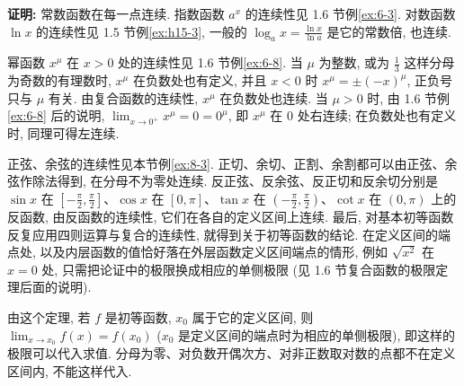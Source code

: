 \documentclass[UTF8,openany]{ctexbook}
\theoremstyle{chinesetextbook}
\newenvironment{cnproof}{\par\indent\textbf{证明:} \ignorespaces}{\par}
\begin{document}
\begin{cnproof}
常数函数在每一点连续. 指数函数 $a^x$ 的连续性见 1.6 节例\ref{ex:6-3}. 对数函数 $\ln x$ 的连续性见 1.5 节例\ref{ex:h15-3}, 一般的 $\displaystyle\log_ax=\frac{\ln x}{\ln a}$ 是它的常数倍, 也连续.

幂函数 $x^\mu$ 在 $x>0$ 处的连续性见 1.6 节例\ref{ex:6-8}. 当 $\mu$ 为整数, 或为 $\displaystyle\frac13$ 这样分母为奇数的有理数时, $x^\mu$ 在负数处也有定义, 并且 $x<0$ 时 $x^\mu=\pm(-x)^\mu$, 正负号只与 $\mu$ 有关. 由复合函数的连续性, $x^\mu$ 在负数处也连续. 当 $\mu>0$ 时, 由 1.6 节例\ref{ex:6-8} 后的说明, $\displaystyle\lim_{x\to0^+}x^\mu=0=0^\mu$, 即 $x^\mu$ 在 $0$ 处右连续; 在负数处也有定义时, 同理可得左连续.

正弦、余弦的连续性见本节例\ref{ex:8-3}. 正切、余切、正割、余割都可以由正弦、余弦作除法得到, 在分母不为零处连续. 反正弦、反余弦、反正切和反余切分别是 $\sin x$ 在 $\displaystyle\left[-\frac\pi2,\frac\pi2\right]$、$\cos x$ 在 $[0,\pi]$、$\tan x$ 在 $\displaystyle\left(-\frac\pi2,\frac\pi2\right)$、$\cot x$ 在 $(0,\pi)$ 上的反函数, 由反函数的连续性, 它们在各自的定义区间上连续. 最后, 对基本初等函数反复应用四则运算与复合的连续性, 就得到关于初等函数的结论. 在定义区间的端点处, 以及内层函数的值恰好落在外层函数定义区间端点的情形, 例如 $\sqrt{x^2}$ 在 $x=0$ 处, 只需把论证中的极限换成相应的单侧极限 (见 1.6 节复合函数的极限定理后面的说明).
\end{cnproof}
由这个定理, 若 $f$ 是初等函数, $x_0$ 属于它的定义区间, 则 $\displaystyle\lim_{x\to x_0}f(x)=f(x_0)$ ($x_0$ 是定义区间的端点时为相应的单侧极限), 即这样的极限可以代入求值. 分母为零、对负数开偶次方、对非正数取对数的点都不在定义区间内, 不能这样代入.
\end{document}
